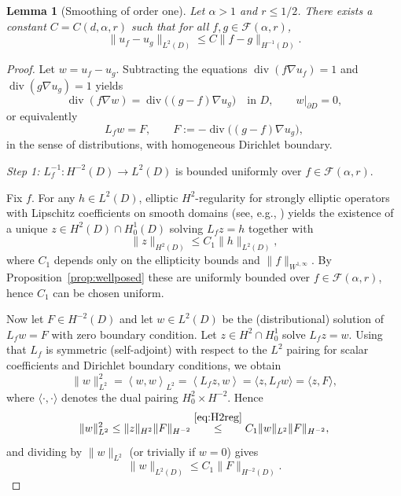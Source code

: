 \documentclass[11pt]{article}
\newtheorem{lemma}{Lemma}
\theoremstyle{definition}
\theoremstyle{remark}
\DeclareMathOperator{\diver}{div}
\newcommand{\1}{\mathbf{1}}
\newcommand{\ip}[2]{\left\langle #1,#2\right\rangle}
\begin{document}
\begin{lemma}[Smoothing of order one]\label{lem:smoothing}
Let $\alpha>1$ and $r\le1/2$. There exists a constant $C=C(d,\alpha,r)$ such that for all $f,g\in\mathcal F(\alpha,r)$,
\[
\|u_f-u_g\|_{L^2(D)}\le C \|f-g\|_{H^{-1}(D)}.
\]
\end{lemma}

\begin{proof}
Let $w=u_f-u_g$. Subtracting the equations $\diver(f\nabla u_f)=1$ and $\diver(g\nabla u_g)=1$ yields
\[
\diver(f\nabla w)=\diver\bigl((g-f)\nabla u_g\bigr)\quad\text{in }D,\qquad w|_{\partial D}=0,
\]
or equivalently
\begin{equation}\label{eq:w-equation}
L_f w = F,\qquad F:=-\diver\bigl((g-f)\nabla u_g\bigr),
\end{equation}
in the sense of distributions, with homogeneous Dirichlet boundary.

\medskip\noindent
\emph{Step 1:} $L_f^{-1}:H^{-2}(D)\to L^2(D)$ is bounded uniformly over $f\in\mathcal F(\alpha,r)$.

Fix $f$. For any $h\in L^2(D)$, elliptic $H^2$-regularity for strongly elliptic operators with Lipschitz coefficients on smooth domains (see, e.g., \cite[Theorem~4.18]{McLean2000}) yields the existence of a unique $z\in H^2(D)\cap H_0^1(D)$ solving $L_f z=h$ together with
\begin{equation}\label{eq:H2reg}
\|z\|_{H^2(D)}\le C_1 \|h\|_{L^2(D)},
\end{equation}
where $C_1$ depends only on the ellipticity bounds and $\|f\|_{W^{1,\infty}}$. By Proposition~\ref{prop:wellposed} these are uniformly bounded over $f\in\mathcal F(\alpha,r)$, hence $C_1$ can be chosen uniform.

Now let $F\in H^{-2}(D)$ and let $w\in L^2(D)$ be the (distributional) solution of $L_f w=F$ with zero boundary condition. Let $z\in H^2\cap H_0^1$ solve $L_f z = w$. Using that $L_f$ is symmetric (self-adjoint) with respect to the $L^2$ pairing for scalar coefficients and Dirichlet boundary conditions, we obtain
\[
\|w\|_{L^2}^2=\ip{w}{w}_{L^2}=\ip{L_f z}{w}=\langle z, L_f w\rangle = \langle z,F\rangle,
\]
where $\langle\cdot,\cdot\rangle$ denotes the dual pairing $H_0^2\times H^{-2}$. Hence
\[
\|w\|_{L^2}^2 \le \|z\|_{H^2}\|F\|_{H^{-2}} \stackrel{\eqref{eq:H2reg}}{\le} C_1 \|w\|_{L^2}\|F\|_{H^{-2}},
\]
and dividing by $\|w\|_{L^2}$ (or trivially if $w=0$) gives
\begin{equation}\label{eq:L2H-2}
\|w\|_{L^2(D)}\le C_1 \|F\|_{H^{-2}(D)}.
\end{equation}


\end{proof}
\end{document}
